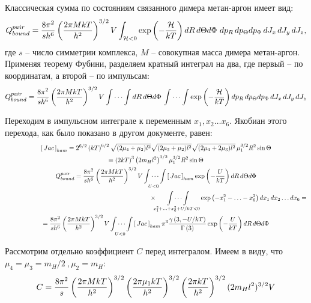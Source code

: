 \documentclass[12pt]{article}
\newcommand{\lb}{\left(}
\newcommand{\rb}{\right)}
\newcommand{\mH}{\mathcal{H}}
\begin{document}
Классическая сумма по состояниям связанного димера метан-аргон имеет вид:
\begin{gather}
		Q_{bound}^{pair} = \frac{8 \pi^2}{s h^6} \lb \frac{2 \pi M k T}{h^2} \rb^{3/2} V \int_{\mH < 0} \exp \lb - \frac{\mH}{kT} \rb dR \, d \Theta d \Phi \, \, d p_R \, d p_{\Theta} d p_{\Phi}  \, d J_x \, d J_y \, d J_z, \notag 
\end{gather}
где $s$ -- число симметрии комплекса, $M$ -- совокупная масса димера метан-аргон. \\
Применяя теорему Фубини, разделяем кратный интеграл на два, где первый -- по координатам, а второй -- по импульсам: 
\begin{gather}
	Q_{bound}^{pair} = \frac{8 \pi^2}{s h^6} \lb \frac{2 \pi M k T}{h^2} \rb^{3/2} V \idotsint dR \, d \Theta d \Phi \,  \idotsint \exp \lb - \frac{\mH}{kT} \rb d p_R \, d p_{\Theta} d p_{\Phi}  \, d J_x \, d J_y \, d J_z \notag  
\end{gather}

Переходим в импульсном интеграле к переменным $x_1, x_2 \ldots x_6$. Якобиан этого перехода, как было показано в другом документе, равен:
\begin{gather}
		\left[ \, Jac \, \right]_{ham} = 2^{6/2} \lb k T \rb^{6/2}\sqrt{(2\mu_4+\mu_2)l^2}\sqrt{(2\mu_3+\mu_2)l^2}\sqrt{(2\mu_4+2\mu_3)l^2}\, \mu_1^{3/2} R^2 \sin \Theta  \notag \\
		= \lb 2 k T \rb^3 \lb 2 m_H l^2 \rb^{3/2} \mu_1^{3/2} R^2 \sin \Theta \notag \\ 
	Q_{bound}^{pair} = \frac{8 \pi^2}{s h^6} \lb \frac{2 \pi M k T}{h^2} \rb^{3/2} V \idotsint\limits_{U < 0} \left[ \, Jac \, \right]_{ham} \exp \lb -\frac{U}{kT} \rb d R \, d \Theta d \Phi \notag \\
	\hspace{8cm} \times \idotsint\limits_{x_1^2 + \ldots + x_6^2 + U/kT < 0} \exp \lb - x_1^2 - \ldots -x_6^2 \rb d x_1 \, d x_2 \ldots d x_6  = \notag \\
	= \frac{8 \pi^2}{s h^6} \lb \frac{2 \pi M k T}{h^2} \rb^{3/2} V \idotsint\limits_{U < 0} \left[ \, Jac \, \right]_{ham} \pi^3 \frac{\gamma \lb 3, - U/kT \rb}{\Gamma \lb 3 \rb} \exp \lb - \frac{U}{kT} \rb dR \, d \Theta d \Phi\notag 
\end{gather}

Рассмотрим отдельно коэффициент $C$ перед интегралом. Имеем в виду, что $\mu_4 = \mu_3 = m_H/2\: , \mu_2 = m_H$:
\begin{gather}
		C = \frac{8 \pi^2}{s} \lb \frac{2 \pi M k T}{h^2} \rb^{3/2} \lb \frac{2 \pi \mu_1 k T}{h^2} \rb^{3/2} \lb \frac{2\pi kT}{h^2} \rb^{3/2} (2m_Hl^2)^{3/2} V \notag
\end{gather}
\end{document}
